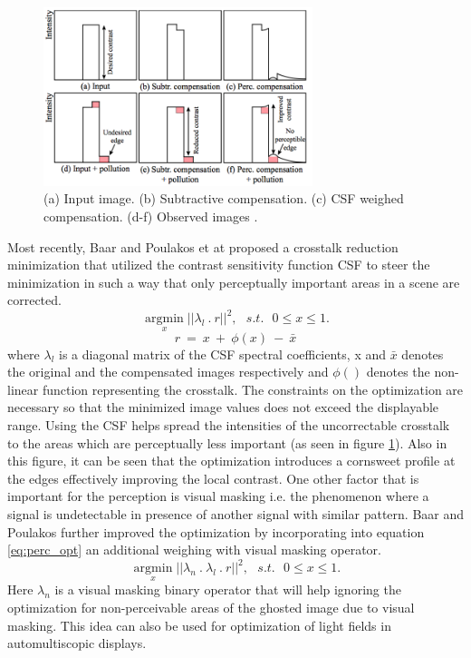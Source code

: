 \begin{figure}
\centering
    \includegraphics[width=0.7\textwidth]{./Template_Figures/perceptual_ct}
    \caption{(a) Input image. (b) Subtractive compensation. (c) CSF weighed compensation. (d-f) Observed images \cite{van2011perceptually}.\label{fig:perc_opt}}
\end{figure}
 Most recently, Baar and Poulakos et at \cite{van2011perceptually} proposed a crosstalk reduction minimization that utilized the contrast sensitivity function CSF to steer the minimization in such a way that only perceptually important areas in a scene are corrected.
 \begin{equation}
\underset{x}{\operatorname{argmin}}||\lambda_l \: . \: r||^2, \:\:\: s.t. \:\:\: 0 \leq x \leq 1.
\label{eq:perc_opt}
\end{equation}
\begin{equation}
r\: = \: x\: + \: \phi(x)\: - \: \bar{x}
\label{eq:residual_eq}
\end{equation}
where $\lambda_l$ is a diagonal matrix of the CSF spectral coefficients, x and $\bar{x}$ denotes the original and the compensated images respectively and $\phi()$ denotes the non-linear function representing the crosstalk. The constraints on the optimization are necessary so that the minimized image values does not exceed the displayable range. Using the CSF helps spread the intensities of the uncorrectable crosstalk to the areas which are perceptually less important (as seen in figure \ref{fig:perc_opt}). Also in this figure, it can be seen that the optimization introduces a cornsweet profile at the edges effectively improving the local contrast. One other factor that is important for the perception is visual masking i.e. the phenomenon where a signal is undetectable in presence of another signal with similar pattern. Baar and Poulakos further improved the optimization by incorporating into equation \ref{eq:perc_opt} an additional weighing with visual masking operator.
\begin{equation}
\underset{x}{\operatorname{argmin}}||\lambda_n\:.\:\lambda_l \: . \: r||^2, \:\:\: s.t. \:\:\: 0 \leq x \leq 1.
\label{eq:perc_opt_vm}
\end{equation}
Here $\lambda_n$ is a visual masking binary operator that will help ignoring the optimization for non-perceivable areas of the ghosted image due to visual masking. This idea can also be used for optimization of light fields in automultiscopic displays.

